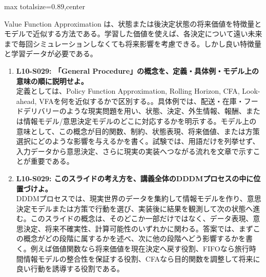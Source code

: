 \begin{minipage}[t]{0.58\textwidth}
\begin{adjustbox}{max totalsize={\textwidth}{0.89\textheight},center}
\begin{minipage}{\textwidth}
Value Function Approximation は、状態または後決定状態の将来価値を特徴量とモデルで近似する方法である。学習した価値を使えば、各決定について遠い未来まで毎回シミュレーションしなくても将来影響を考慮できる。しかし良い特徴量と学習データが必要である。\par{}\begin{enumerate}\item \textbf{L10-S029: 「General Procedure」の概念を、定義・具体例・モデル上の意味の順に説明せよ。}\\定義としては、Policy Function Approximation, Rolling Horizon, CFA, Look-ahead, VFAを何を近似するかで区別する。。具体例では、配送・在庫・フードデリバリーのような現実問題を用い、状態、決定、外生情報、報酬、または情報モデル/意思決定モデルのどこに対応するかを明示する。モデル上の意味として、この概念が目的関数、制約、状態表現、将来価値、または方策選択にどのような影響を与えるかを書く。試験では、用語だけを列挙せず、入力データから意思決定、さらに現実の実装へつながる流れを文章で示すことが重要である。\item \textbf{L10-S029: このスライドの考え方を、講義全体のDDDMプロセスの中に位置づけよ。}\\DDDMプロセスでは、現実世界のデータを集約して情報モデルを作り、意思決定モデルまたは方策で行動を選び、実装後に結果を観測して次の状態へ進む。このスライドの概念は、そのどこか一部だけではなく、データ表現、意思決定、将来不確実性、計算可能性のいずれかに関わる。答案では、まずこの概念がどの段階に属するかを述べ、次に他の段階へどう影響するかを書く。例えば価値関数なら将来価値を現在決定へ戻す役割、FIFOなら旅行時間情報モデルの整合性を保証する役割、CFAなら目的関数を調整して将来に良い行動を誘導する役割である。\end{enumerate}
\end{minipage}
\end{adjustbox}
\end{minipage}


